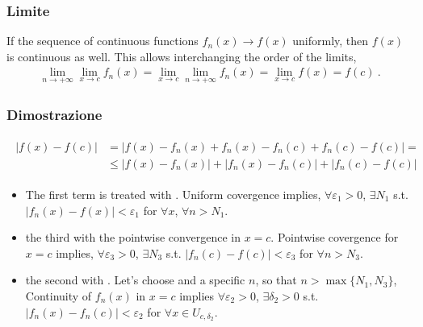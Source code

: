 \documentclass[letterpaper,10pt,italian]{jupyterBook}
\begin{document}
\subsubsection{Limite}
\label{\detokenize{ch/series/series-functions-real:limite}}
\sphinxAtStartPar
If the sequence of continuous functions \(f_n(x) \rightarrow f(x)\) uniformly, then \(f(x)\) is continuous as well.
This allows interchanging the order of the limits,
\begin{equation*}
\begin{split}\lim_{n \rightarrow +\infty} \lim_{x \rightarrow c}f_n(x) = \lim_{x \rightarrow c} \lim_{n \rightarrow +\infty} f_n(x) = \lim_{x \rightarrow c} f(x) = f(c) \ .\end{split}
\end{equation*}\subsubsection*{Dimostrazione}
\begin{equation*}
\begin{split}\begin{aligned}
  | f(x) - f(c) |
  & = | f(x) - f_n(x) + f_n(x) - f_n(c) + f_n(c) - f(c)| = \\
  & \le | f(x) - f_n(x) | + | f_n(x) - f_n(c) | + | f_n(c) - f(c)|
\end{aligned}\end{split}
\end{equation*}\begin{itemize}
\item {} 
\sphinxAtStartPar
The first term is treated with .
Uniform covergence implies, \(\forall \varepsilon_1 > 0\), \(\exists N_1\) s.t. \(| f_n(x) - f(x) | < \varepsilon_1\) for \(\forall x\), \(\forall n > N_1\).

\item {} 
\sphinxAtStartPar
the third with the pointwise convergence in \(x = c\).
Pointwise covergence for \(x = c\) implies, \(\forall \varepsilon_3 > 0\), \(\exists N_3\) s.t. \(| f_n(c) - f(c) | < \varepsilon_3\) for \(\forall n > N_3\).

\item {} 
\sphinxAtStartPar
the second with . Let’s choose and  a specific \(n\), so that \(n > \max\{ N_1, N_3 \}\), Continuity of \(f_{n}(x)\) in \(x = c\) implies \(\forall \varepsilon_2 > 0\), \(\exists \delta_2 > 0\) s.t. \(|f_{n}(x) - f_{n}(c)| < \varepsilon_2\) for \(\forall x \in U_{c,\delta_2}\).

\end{itemize}
\end{document}
